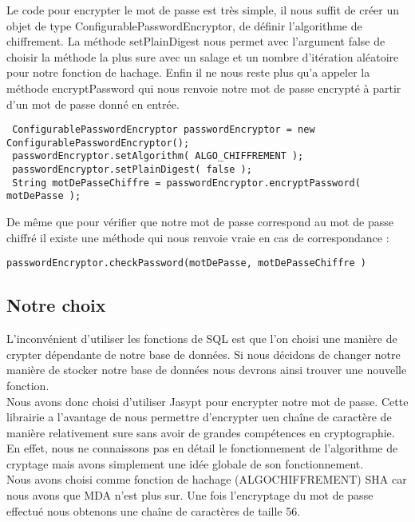 Le code pour encrypter le mot de passe est très simple, il nous suffit de créer un objet de type ConfigurablePasswordEncryptor, de définir l'algorithme de chiffrement. La méthode setPlainDigest nous permet avec l'argument false de choisir la méthode la plus sure avec un salage et un nombre d'itération aléatoire pour notre fonction de hachage. Enfin il ne nous reste plus qu'a appeler la méthode encryptPassword qui nous renvoie notre mot de passe encrypté à partir d'un mot de passe donné en entrée. 
\begin{lstlisting}
 ConfigurablePasswordEncryptor passwordEncryptor = new ConfigurablePasswordEncryptor();
 passwordEncryptor.setAlgorithm( ALGO_CHIFFREMENT );
 passwordEncryptor.setPlainDigest( false );
 String motDePasseChiffre = passwordEncryptor.encryptPassword( motDePasse );
\end{lstlisting} 


De même que pour vérifier que notre mot de passe correspond au mot de passe chiffré il existe une méthode qui nous renvoie vraie en cas de correspondance :

\begin{lstlisting}
passwordEncryptor.checkPassword(motDePasse, motDePasseChiffre )
\end{lstlisting}


\subsection{Notre choix}
L'inconvénient d'utiliser les fonctions de SQL est que l'on choisi une manière de crypter dépendante de notre base de données. Si nous décidons de changer notre manière de stocker notre base de données nous devrons ainsi trouver une nouvelle fonction. \\

Nous avons donc choisi d'utiliser Jasypt pour encrypter notre mot de passe. Cette librairie a l'avantage de nous permettre d'encrypter uen chaîne de caractère de manière relativement sure sans avoir de grandes compétences en cryptographie. En effet, nous ne connaissons pas en détail le fonctionnement de l'algorithme de cryptage mais avons simplement une idée globale de son fonctionnement. \\

Nous avons choisi comme fonction de hachage (ALGOCHIFFREMENT) SHA car nous avons que MDA n'est plus sur. Une fois l'encryptage du mot de passe effectué nous obtenons une chaîne de caractères de taille 56.